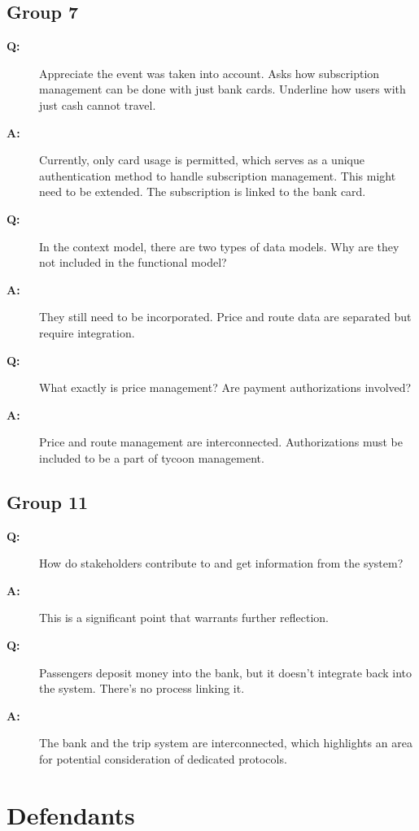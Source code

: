 \documentclass{article}
\begin{document}
\subsection{Group 7}
\begin{description}
  \item[\textbf{Q:}] Appreciate the event was taken into account. Asks how subscription management can be done with just bank cards. Underline how users with just cash cannot travel.
  \item[\textbf{A:}] Currently, only card usage is permitted, which serves as a unique authentication method to handle subscription management. This might need to be extended. The subscription is linked to the bank card.
  
  \item[\textbf{Q:}] In the context model, there are two types of data models. Why are they not included in the functional model?
  \item[\textbf{A:}] They still need to be incorporated. Price and route data are separated but require integration.
  
  \item[\textbf{Q:}] What exactly is price management? Are payment authorizations involved?
  \item[\textbf{A:}] Price and route management are interconnected. Authorizations must be included to be a part of tycoon management.
\end{description}

\subsection{Group 11}
\begin{description}
  \item[\textbf{Q:}] How do stakeholders contribute to and get information from the system?
  \item[\textbf{A:}] This is a significant point that warrants further reflection.
  
  \item[\textbf{Q:}] Passengers deposit money into the bank, but it doesn't integrate back into the system. There's no process linking it.
  \item[\textbf{A:}] The bank and the trip system are interconnected, which highlights an area for potential consideration of dedicated protocols.
\end{description}

\section{Defendants}
\end{document}
